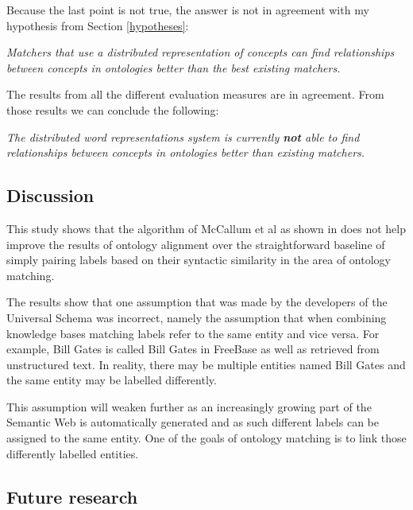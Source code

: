 \documentclass{article}
\begin{document}
 Because the last point is not true, the answer is not in agreement with my hypothesis from Section \ref{hypotheses}:
 
 \begin{center}
 \textit{Matchers that use a distributed representation of concepts can find relationships between concepts in ontologies better than the best existing matchers.}
 \end{center}
 
The results from all the different evaluation measures are in agreement. From those results we can conclude the following:

 \begin{center}
 \textit{
 The distributed word representations system is currently \textbf{not} able to find relationships between concepts in ontologies better than existing matchers.
 }
 \end{center}
 
 \subsection{Discussion}
  This study shows that the algorithm of McCallum et al as shown in \cite{mccallumweblecture} does not help improve the results of ontology alignment over the straightforward baseline of simply pairing labels based on their syntactic similarity in the area of ontology matching. 

  The results show that one assumption that was made by the developers of the Universal Schema was incorrect, namely the assumption that when combining knowledge bases matching labels refer to the same entity and vice versa. For example, Bill Gates is called Bill Gates in FreeBase as well as retrieved from unstructured text. In reality, there may be multiple entities named Bill Gates and the same entity may be labelled differently. 
  
  This assumption will weaken further as an increasingly growing part of the Semantic Web is automatically generated and as such different labels can be assigned to the same entity. One of the goals of ontology matching is to link those differently labelled entities.
  
 \subsection{Future research}
 
\end{document}
